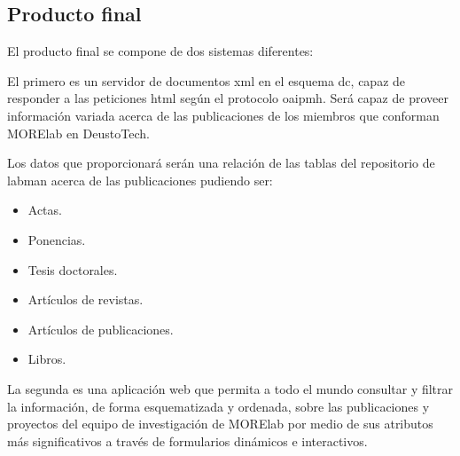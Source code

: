 \subsection{Producto final}

El producto final se compone de dos sistemas diferentes:

El primero es un servidor de documentos \acrshort{xml}\cite{XML} en el esquema \acrshort{dc}, capaz de responder a las peticiones \acrshort{html} según el protocolo \acrshort{oaipmh}. Será capaz de proveer información variada acerca de las publicaciones de los miembros que conforman MORElab en DeustoTech.

Los datos que proporcionará serán una relación de las tablas del repositorio de \acrshort{labman} acerca de las publicaciones pudiendo ser:

\begin{itemize}
	\item Actas.
	\item Ponencias.
	\item Tesis doctorales.
	\item Artículos de revistas.
	\item Artículos de publicaciones.
	\item Libros.

\end{itemize}

La segunda es una aplicación web que permita a todo el mundo consultar y filtrar la información, de forma esquematizada y ordenada, sobre las publicaciones y proyectos del equipo de investigación de MORElab por medio de sus atributos más significativos a través de formularios dinámicos e interactivos.